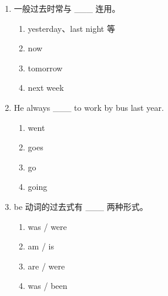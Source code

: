 \documentclass[11pt,a4paper]{ctexart}
\begin{document}
\begin{enumerate}[leftmargin=*,itemsep=4pt]
\item 一般过去时常与 \_\_\_ 连用。
\begin{enumerate}[label=\Alph*.,leftmargin=2em,itemsep=1pt,topsep=2pt]
\item yesterday、last night 等
\item now
\item tomorrow
\item next week
\end{enumerate}
\item He always \_\_\_ to work by bus last year.
\begin{enumerate}[label=\Alph*.,leftmargin=2em,itemsep=1pt,topsep=2pt]
\item went
\item goes
\item go
\item going
\end{enumerate}
\item be 动词的过去式有 \_\_\_ 两种形式。
\begin{enumerate}[label=\Alph*.,leftmargin=2em,itemsep=1pt,topsep=2pt]
\item was / were
\item am / is
\item are / were
\item was / been
\end{enumerate}
\end{enumerate}
\end{document}
